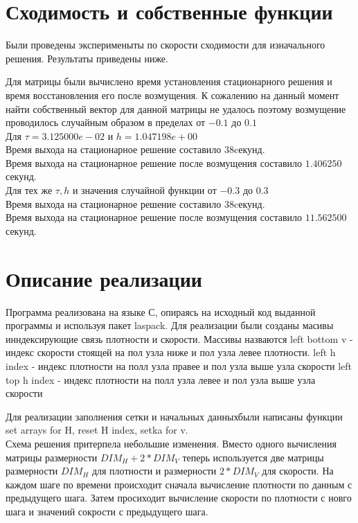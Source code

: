 \documentclass[a4paper, 25pt]{article}
\begin{document}
\section{Сходимость и собственные функции}
Были проведены эксперименыты по скорости сходимости для изначального решения. Результаты приведены ниже.

Для матрицы были вычислено время установления стационарного решения и время восстановления его после возмущения.
К сожалению на данный момент найти собственный вектор для данной матрицы не удалось поэтому возмущение проводилось случайным образом в пределах от $-0.1$ до $ 0.1$ \\
Для $\tau = 3.125000e-02$ и $ h = 1.047198e+00 $ \\
Время выхода на стационарное решение составило $38$cекунд.\\
Время выхода на стационарное решение после возмущения составило $1.406250$ секунд.\\
Для тех же $\tau, h$ и значения случайной функции от $-0.3$ до $ 0.3$ \\
Время выхода на стационарное решение составило $38$cекунд.\\
Время выхода на стационарное решение после возмущения составило $11.562500$ секунд.\\
\section{Описание реализации}
Программа реализована на языке С, опираясь на исходный код выданной программы и используя пакет laspack.
Для реализации были созданы масивы инндексирующие связь плотности и скорости. Массивы назваются left bottom v - индекс скорости стоящей на пол узла ниже и пол узла левее плотности.
left h index -  индекс плотности на полл узла правее и пол узла выше узла скорости
left top h index -  индекс плотности на полл узла левее и пол узла выше узла скорости

Для реализации заполнения сетки и начальных данныхбыли написаны функции set arrays for H, reset H index, setka for v.\\
Схема решения притерпела небольшие изменения. Вместо одного вычисления матрицы размерности $DIM_H + 2 * DIM_V$ теперь используется две матрицы размерности $DIM_H$ для плотности  и размерности $2 * DIM_V$ для скорости. На каждом шаге по времени происходит сначала вычисление плотности по данным с предыдущего шага. Затем просиходит вычисление скорости по плотности с новго шага и значений сокрости с предыдущего шага. 
\end{document}
